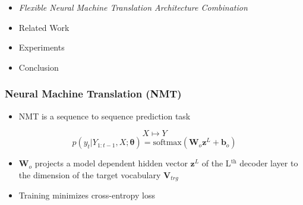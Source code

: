 \begin{frame}

\begin{itemize}
    \item \emph{\color{UOYellow}Flexible Neural Machine Translation Architecture
        Combination}
    \item Related Work
    \item Experiments
    \item Conclusion
\end{itemize}

\end{frame}

\begin{frame}
\frametitle{Neural Machine Translation (NMT)}

\begin{itemize} 
    \item NMT is a sequence to sequence prediction task 
\end{itemize}
\[
    X \mapsto Y
\]
\[
    p(y_t | Y_{1:t-1}, X; \boldsymbol{\theta}) = \text{softmax}(\boldsymbol{W}_o
            \boldsymbol{z}^L + \boldsymbol{b}_o)
\]

\begin{itemize}
    \item $\boldsymbol{W}_o$ projects a model dependent hidden vector
    $\boldsymbol{z}^L$ of the L$^\text{th}$ decoder layer to the dimension of
    the target vocabulary $\boldsymbol{V}_{trg}$
    \item Training minimizes cross-entropy loss
\end{itemize}

\end{frame}

